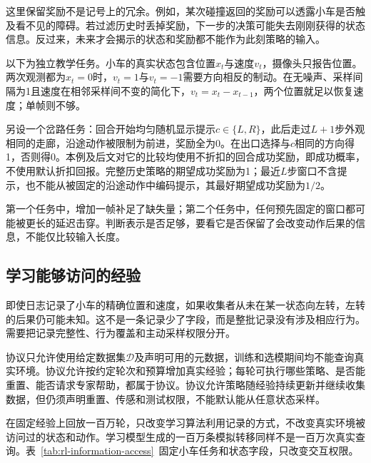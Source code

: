 这里保留奖励不是记号上的冗余。例如，某次碰撞返回的奖励可以透露小车是否触及看不见的障碍。若过滤历史时丢掉奖励，下一步的决策可能失去刚刚获得的状态信息。反过来，未来才会揭示的状态和奖励都不能作为此刻策略的输入。

\begin{example}[相同位置与不同记忆]
  \label{ex:rl-information-cue}
  以下为独立教学任务。小车的真实状态包含位置$x_t$与速度$v_t$，摄像头只报告位置。两次观测都为$x_t=0$时，$v_t=1$与$v_t=-1$需要方向相反的制动。在无噪声、采样间隔为1且速度在相邻采样间不变的简化下，$v_t=x_t-x_{t-1}$，两个位置就足以恢复速度；单帧则不够。

  另设一个岔路任务：回合开始均匀随机显示提示$c\in\{L,R\}$，此后走过$L+1$步外观相同的走廊，沿途动作被限制为前进，奖励全为0。在出口选择与$c$相同的方向得1，否则得0。本例及后文对它的比较均使用不折扣的回合成功奖励，即成功概率，不使用默认折扣回报。完整历史策略的期望成功奖励为1；最近$L$步窗口不含提示，也不能从被固定的沿途动作中编码提示，其最好期望成功奖励为$1/2$。
\end{example}

第一个任务中，增加一帧补足了缺失量；第二个任务中，任何预先固定的窗口都可能被更长的延迟击穿。判断表示是否足够，要看它是否保留了会改变动作后果的信息，不能仅比较输入长度。

\subsection{学习能够访问的经验}
\label{sec:rl-information-data-access}

即使日志记录了小车的精确位置和速度，如果收集者从未在某一状态向左转，左转的后果仍可能未知。这不是一条记录少了字段，而是整批记录没有涉及相应行为。需要把记录完整性、行为覆盖和主动采样权限分开。

\begin{definition}[经验访问协议]
  \label{def:rl-information-access}
  协议只允许使用给定数据集$\mathcal D$及声明可用的元数据，训练和选模期间均不能查询真实环境。协议允许按约定轮次和预算增加真实经验；每轮可执行哪些策略、是否能重置、能否请求专家帮助，都属于协议。协议允许策略随经验持续更新并继续收集数据，但仍须声明重置、传感和测试权限，不能默认能从任意状态采样。
\end{definition}

在固定经验上回放一百万轮，只改变学习算法利用记录的方式，不改变真实环境被访问过的状态和动作。学习模型生成的一百万条模拟转移同样不是一百万次真实查询。表~\ref{tab:rl-information-access}~固定小车任务和状态字段，只改变交互权限。

